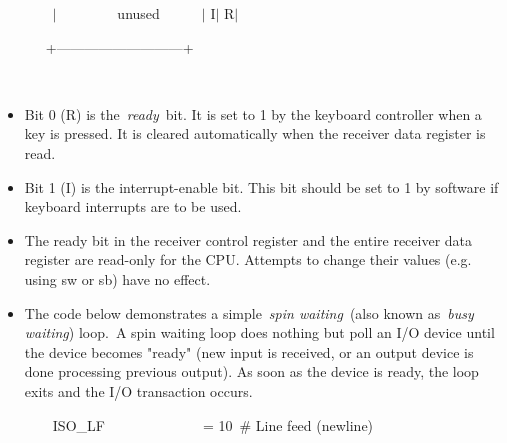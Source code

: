 \documentclass[12pt]{article}
\begin{document}
\begin{itemize}
{\fontsize{10pt}{12.0pt}\selectfont  \tabto{0.64in} \ \ \ \ $ \vert $ \ \ \ \ \ \ \ \ unused\ \ \ \ \ \    $ \vert $ I$ \vert $ R$ \vert $ \par}\par

{\fontsize{10pt}{12.0pt}\selectfont  \tabto{0.64in} \ \ \  +---------------------------+\par}\par

{\fontsize{10pt}{12.0pt}\selectfont  \tabto{0.64in} \ \ \  \par}\par

\setlength{\parskip}{5.04pt}
	\item {\fontsize{13pt}{15.6pt}\selectfont Bit 0 (R) is the \textit{ready} bit. It is set to 1 by the keyboard controller when a key is pressed. It is cleared automatically when the receiver data register is read.\par}\par

	\item {\fontsize{13pt}{15.6pt}\selectfont Bit 1 (I) is the interrupt-enable bit. This bit should be set to 1 by software if keyboard interrupts are to be used. \par}\par

	\item {\fontsize{13pt}{15.6pt}\selectfont The ready bit in the receiver control register and the entire receiver data register are read-only for the CPU. Attempts to change their values (e.g. using sw or sb) have no effect.\par}\par

	\item {\fontsize{13pt}{15.6pt}\selectfont The code below demonstrates a simple \textit{spin waiting} (also known as \textit{busy waiting}) loop. A spin waiting loop does nothing but poll an I/O device until the device becomes "ready" (new input is received, or an output device is done processing previous output). As soon as the device is ready, the loop exits and the I/O transaction occurs.\par}\par

\setlength{\parskip}{0.0pt}
{\fontsize{10pt}{12.0pt}\selectfont \ \ \ \ ISO\_LF\ \ \ \ \ \ \ \ \ \ \ \ \ \ =   10\  $\#$  Line feed (newline)\par}\par


\end{itemize}
\end{document}
